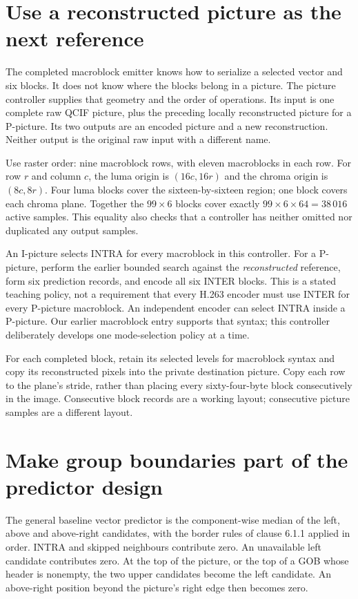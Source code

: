 \section{Use a reconstructed picture as the next reference}
The completed macroblock emitter knows how to serialize a selected vector and
six blocks. It does not know where the blocks belong in a picture. The picture
controller supplies that geometry and the order of operations. Its input is one
complete raw QCIF picture, plus the preceding locally reconstructed picture for
a P-picture. Its two outputs are an encoded picture and a new reconstruction.
Neither output is the original raw input with a different name.

Use raster order: nine macroblock rows, with eleven macroblocks in each row.
For row $r$ and column $c$, the luma origin is $(16c,16r)$ and the chroma origin
is $(8c,8r)$. Four luma blocks cover the sixteen-by-sixteen region; one block
covers each chroma plane. Together the $99\times6$ blocks cover exactly
$99\times6\times64=38\,016$ active samples. This equality also checks that a
controller has neither omitted nor duplicated any output samples.

An I-picture selects INTRA for every macroblock in this controller. For a
P-picture, perform the earlier bounded search against the \emph{reconstructed}
reference, form six prediction records, and encode all six INTER blocks.
This is a stated teaching policy, not a requirement that every H.263 encoder
must use INTER for every P-picture macroblock. An independent encoder can select
INTRA inside a P-picture. Our earlier macroblock entry supports that syntax;
this controller deliberately develops one mode-selection policy at a time.

For each completed block, retain its selected levels for macroblock syntax and
copy its reconstructed pixels into the private destination picture. Copy each
row to the plane's stride, rather than placing every sixty-four-byte block
consecutively in the image. Consecutive block records are a working layout;
consecutive picture samples are a different layout.

\section{Make group boundaries part of the predictor design}
The general baseline vector predictor is the component-wise median of the left,
above and above-right candidates, with the border rules of clause 6.1.1 applied
in order. INTRA and skipped neighbours contribute zero. An unavailable left
candidate contributes zero. At the top of the picture, or the top of a GOB whose
header is nonempty, the two upper candidates become the left candidate. An
above-right position beyond the picture's right edge then becomes zero.

